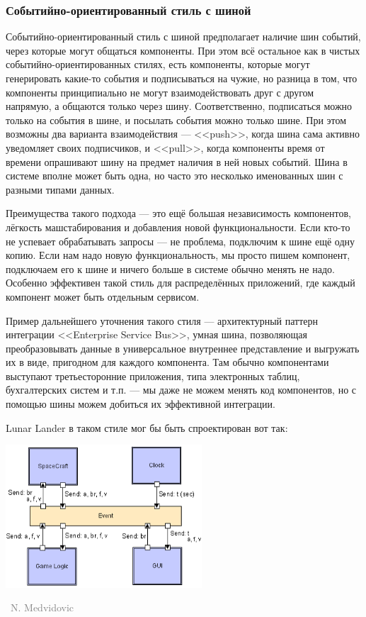 \documentclass[a5paper]{article}
\newcommand{\attribution}[1] {
    \vspace{-4mm}\begin{flushright}\begin{scriptsize}\textcolor{gray}
    {\textcopyright\, #1}\end{scriptsize}\end{flushright}
}
\begin{document}
\subsubsection{Событийно-ориентированный стиль с шиной}

Событийно-ориентированный стиль с шиной предполагает наличие шин событий, через которые могут общаться компоненты. При этом всё остальное как в чистых событийно-ориентированных стилях, есть компоненты, которые могут генерировать какие-то события и подписываться на чужие, но разница в том, что компоненты принципиально не могут взаимодействовать друг с другом напрямую, а общаются только через шину. Соответственно, подписаться можно только на события в шине, и посылать события можно только шине. При этом возможны два варианта взаимодействия --- <<push>>, когда шина сама активно уведомляет своих подписчиков, и <<pull>>, когда компоненты время от времени опрашивают шину на предмет наличия в ней новых событий. Шина в системе вполне может быть одна, но часто это несколько именованных шин с разными типами данных.

Преимущества такого подхода --- это ещё большая независимость компонентов, лёгкость машстабирования и добавления новой функциональности. Если кто-то не успевает обрабатывать запросы --- не проблема, подключим к шине ещё одну копию. Если нам надо новую функциональность, мы просто пишем компонент, подключаем его к шине и ничего больше в системе обычно менять не надо. Особенно эффективен такой стиль для распределённых приложений, где каждый компонент может быть отдельным сервисом. 

Пример дальнейшего уточнения такого стиля --- архитектурный паттерн интеграции <<Enterprise Service Bus>>, умная шина, позволяющая преобразовывать данные в универсальное внутреннее представление и выгружать их в виде, пригодном для каждого компонента. Там обычно компонентами выступают третьесторонние приложения, типа электронных таблиц, бухгалтерских систем и т.п. --- мы даже не можем менять код компонентов, но с помощью шины можем добиться их эффективной интеграции.

Lunar Lander в таком стиле мог бы быть спроектирован вот так:

\begin{center}
    \includegraphics[width=0.55\textwidth]{eventBasedLL.png}
    \attribution{N. Medvidovic}
\end{center}
\end{document}
